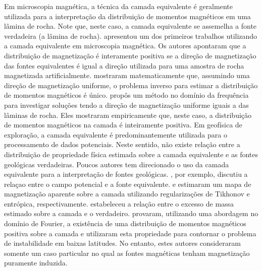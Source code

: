 Em microscopia magnética, a técnica da camada equivalente é geralmente utilizada para a interpretação da distribuição de momentos magnéticos em uma lâmina de rocha. Note que, neste caso, a camada equivalente se assemelha a fonte verdadeira (a lâmina de rocha). \cite{weiss2007} apresentou um dos primeiros trabalhos utilizando a camada equivalente em microscopia magnética. Os autores apontaram que a distribuição de magnetização é interamente positiva se a direção de magnetização das fontes equivalentes é igual a direção utilizada para uma amostra de rocha magnetizada artificialmente. \cite{baratchart2013} mostraram matematicamente que, assumindo uma direção de magnetização uniforme, o problema inverso para estimar a distribuição de momentos magnéticos é único. \cite{lima2013} propôs um método no domínio da frequência para investigar soluções tendo a direção de magnetização uniforme iguais a das lâminas de rocha. Eles mostraram empiricamente que, neste caso, a distribuição de momentos magnéticos na camada é inteiramente positiva.  Em geofísica de exploração, a camada equivalente é predominantemente utilizada para o processamento de dados potenciais. Neste sentido, não existe relação entre a distribuição de propriedade física estimada sobre a camada equivalente e as fontes geológicas verdadeiras. Poucos autores tem direcionado o uso da camada equivalente para a interpretação de fontes geológicas. \cite{pedersen1991}, por exemplo, discutiu a relaçao entre o campo potencial e a fonte equivalente. \cite{medeiros_silva1996} e \cite{silvadias_etal_2010} estimaram um mapa de magnetização aparente sobre a camada utilizando regularizações de Tikhonov e entrópica, respectivamente. \cite{siqueira_etal_2017} estabeleceu a relação entre o excesso de massa estimado sobre a camada e o verdadeiro. \cite{li_etal_2014} provaram, utilizando uma abordagem no domínio de Fourier, a existência de uma distribuição de momentos magnéticos positiva sobre a camada e utilizaram esta propriedade para contornar o problema de instabilidade em baixas latitudes. No entanto, estes autores consideraram somente um caso particular no qual as fontes magnéticas tenham magnetização puramente induzida. 

